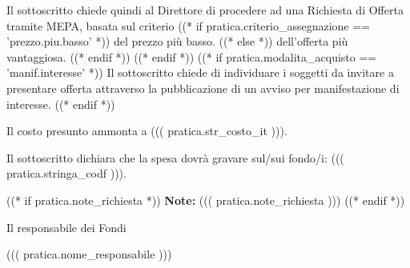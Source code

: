 \documentclass[a4paper,12pt]{letter}
\begin{document}
Il sottoscritto chiede quindi al Direttore di procedere ad una Richiesta di Offerta
tramite MEPA, basata sul criterio %
   ((* if pratica.criterio_assegnazione == 'prezzo.piu.basso' *)) %
del prezzo pi\`u basso.
   ((* else *)) %
dell'offerta pi\`u vantaggiosa.
   ((* endif *))
((* endif *))
((* if pratica.modalita_acquisto == 'manif.interesse' *))
Il sottoscritto chiede di individuare i soggetti da invitare a presentare offerta
attraverso la pubblicazione di un avviso per manifestazione di interesse.
((* endif *))

Il costo presunto ammonta a ((( pratica.str_costo_it ))).

Il sottoscritto dichiara che la spesa dovr\`a gravare sul/sui fondo/i:
((( pratica.stringa_codf ))). 

((* if pratica.note_richiesta *))
{\bf Note:} ((( pratica.note_richiesta )))
((* endif *))

\vspace{0.5cm}

\begin{flushright}
\begin{minipage}[c]{6cm}
Il responsabile dei Fondi

((( pratica.nome_responsabile )))

\end{minipage}
\end{flushright}
\end{document}
